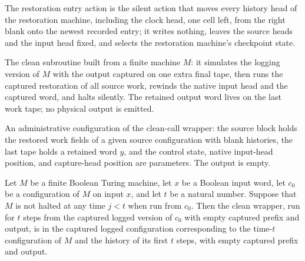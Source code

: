 \begin{definition}
\label{Complexity.enumCont_undoEntry}
\leanok
{}
The restoration entry action is the silent action that moves every history head
of the restoration machine, including the clock head, one cell left, from the right
blank onto the newest recorded entry; it writes nothing, leaves the source heads
and the input head fixed, and selects the restoration machine's checkpoint state.
\end{definition}

\begin{definition}
\label{Complexity.enumCont_cleanTM}
\leanok
{}
The clean subroutine built from a finite machine $M$: it simulates the logging
version of $M$ with the output captured on one extra final tape, then runs the
captured restoration of all source work, rewinds the native input head and the
captured word, and halts silently. The retained output word lives on the last
work tape; no physical output is emitted.
\end{definition}

\begin{definition}
\label{Complexity.enumCont_cleanCfg}
\leanok
{}
An administrative configuration of the clean-call wrapper: the source block holds
the restored work fields of a given source configuration with blank histories,
the last tape holds a retained word $y$, and the control state, native input-head
position, and capture-head position are parameters. The output is empty.
\end{definition}

\begin{lemma}
\label{Complexity.enumCont_clean_capture}
\leanok
{}
Let $M$ be a finite Boolean Turing machine, let $x$ be a Boolean input word, let $c_0$
be a configuration of $M$ on input $x$, and let $t$ be a natural number. Suppose that
$M$ is not halted at any time $j<t$ when run from $c_0$. Then the clean wrapper, run for
$t$ steps from the captured logged version of $c_0$ with empty captured prefix and
output, is in the captured logged configuration corresponding to the time-$t$
configuration of $M$ and the history of its first $t$ steps, with empty captured prefix
and output.
\end{lemma}


